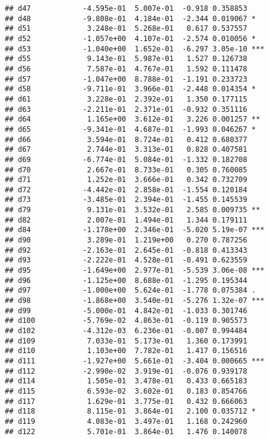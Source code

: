 \documentclass[
]{article}
\begin{document}
\begin{verbatim}
## d47            -4.595e-01  5.007e-01  -0.918 0.358853    
## d48            -9.808e-01  4.184e-01  -2.344 0.019067 *  
## d51             3.248e-01  5.268e-01   0.617 0.537557    
## d52            -1.057e+00  4.107e-01  -2.574 0.010056 *  
## d53            -1.040e+00  1.652e-01  -6.297 3.05e-10 ***
## d55             9.143e-01  5.987e-01   1.527 0.126738    
## d56             7.587e-01  4.767e-01   1.592 0.111478    
## d57            -1.047e+00  8.788e-01  -1.191 0.233723    
## d58            -9.711e-01  3.966e-01  -2.448 0.014354 *  
## d61             3.228e-01  2.392e-01   1.350 0.177115    
## d63            -2.211e-01  2.371e-01  -0.932 0.351116    
## d64             1.165e+00  3.612e-01   3.226 0.001257 ** 
## d65            -9.341e-01  4.687e-01  -1.993 0.046267 *  
## d66             3.594e-01  8.724e-01   0.412 0.680377    
## d67             2.744e-01  3.313e-01   0.828 0.407581    
## d69            -6.774e-01  5.084e-01  -1.332 0.182708    
## d70             2.667e-01  8.733e-01   0.305 0.760085    
## d71             1.252e-01  3.666e-01   0.342 0.732709    
## d72            -4.442e-01  2.858e-01  -1.554 0.120184    
## d73            -3.485e-01  2.394e-01  -1.455 0.145539    
## d79             9.131e-01  3.532e-01   2.585 0.009735 ** 
## d82             2.007e-01  1.494e-01   1.344 0.179111    
## d84            -1.178e+00  2.346e-01  -5.020 5.19e-07 ***
## d90             3.289e-01  1.219e+00   0.270 0.787256    
## d92            -2.163e-01  2.645e-01  -0.818 0.413343    
## d93            -2.222e-01  4.528e-01  -0.491 0.623559    
## d95            -1.649e+00  2.977e-01  -5.539 3.06e-08 ***
## d96            -1.125e+00  8.688e-01  -1.295 0.195344    
## d97            -1.000e+00  5.624e-01  -1.778 0.075384 .  
## d98            -1.868e+00  3.540e-01  -5.276 1.32e-07 ***
## d99            -5.000e-01  4.842e-01  -1.033 0.301746    
## d100           -5.769e-02  4.863e-01  -0.119 0.905573    
## d102           -4.312e-03  6.236e-01  -0.007 0.994484    
## d109            7.033e-01  5.173e-01   1.360 0.173991    
## d110            1.103e+00  7.782e-01   1.417 0.156516    
## d111           -1.927e+00  5.661e-01  -3.404 0.000665 ***
## d112           -2.990e-02  3.919e-01  -0.076 0.939178    
## d114            1.505e-01  3.478e-01   0.433 0.665183    
## d115            6.593e-02  3.602e-01   0.183 0.854766    
## d117            1.629e-01  3.775e-01   0.432 0.666063    
## d118            8.115e-01  3.864e-01   2.100 0.035712 *  
## d119            4.083e-01  3.497e-01   1.168 0.242960    
## d122            5.701e-01  3.864e-01   1.476 0.140078    

\end{verbatim}
\end{document}
